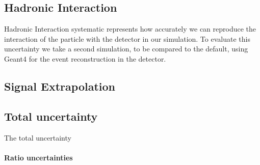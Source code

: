 \subsection{Hadronic Interaction}
Hadronic Interaction systematic represents how accurately we can reproduce the interaction of the particle with the detector in our simulation. To evaluate this uncertainty we take a second simulation, to be compared to the default, using Geant4 for the event reconstruction in the detector.

\subsection{Signal Extrapolation}


\subsection{Total uncertainty}
The total uncertainty 

\paragraph{Ratio uncertainties}


